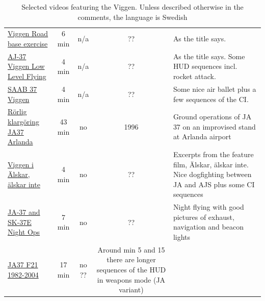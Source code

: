 \begin{landscape}
\begin{table}[!th]
\begin{tabular}{|p{5cm}|c|c|c|p{9cm}|}
\href{https://www.youtube.com/watch?v=slm9ksxU0HY}{Viggen Road base exercise} & 6 min & n/a & ?? & As the title says.\\
\href{https://www.youtube.com/watch?v=hWrsP3hq5M8}{AJ-37 Viggen Low Level Flying} & 4 min & n/a & ?? & As the title says. Some HUD sequences incl. rocket attack.\\
\href{https://www.youtube.com/watch?v=UOszNlNeRVs}{SAAB 37 Viggen} & 4 min & n/a & ?? & Some nice air ballet plus a few sequences of the CI.\\
\href{https://www.youtube.com/watch?v=IbsYsUvCy7s}{Rörlig klargöring JA37 Arlanda} & 43 min & no & 1996 & Ground operations of JA 37 on an improvised stand at Arlanda airport\\
\href{https://vimeo.com/60091080}{Viggen i Älskar, älskar inte} & 4 min & no & ?? & Excerpts from the feature film, Älskar, älskar inte. Nice dogfighting between JA and AJS plus some CI sequences\\
\href{https://www.youtube.com/watch?v=eT00_OVrv7o}{JA-37 and SK-37E Night Ops} & 7 min & no & ?? & Night flying with good pictures of exhaust, navigation and beacon lights\\
\href{https://www.youtube.com/watch?v=0ocSUd9_5Tw}{JA37 F21 1982-2004} & 17 min & no ?? & Around min 5 and 15 there are longer sequences of the HUD in weapons mode (JA variant)\\

\hline
\end{tabular}
\caption{Selected videos featuring the Viggen. Unless described otherwise in the comments, the language is Swedish}
\end{table}

\end{landscape}


